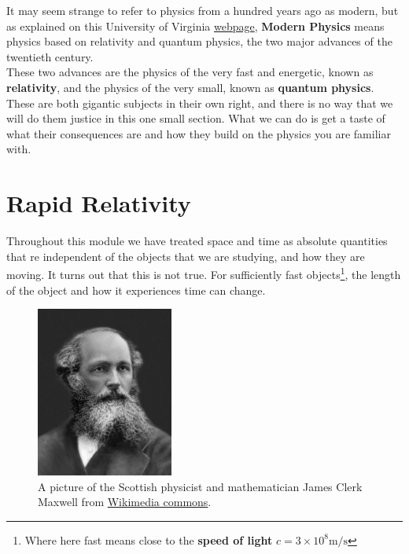 \documentclass[a4paper,12pt]{book}
\begin{document}
It may seem strange to refer to physics from a hundred years ago as modern, but as explained on this University of Virginia \href{https://galileo.phys.virginia.edu/classes/252/home.html}{webpage}, \textbf{Modern Physics} means physics based on relativity and quantum physics, the two major advances of the twentieth century.\\

These two advances are the physics of the very fast and energetic, known as \textbf{relativity}, and the physics of the very small, known as \textbf{quantum physics}. These are both gigantic subjects in their own right, and there is no way that we will do them justice in this one small section. What we can do is get a taste of what their consequences are and how they build on the physics you are familiar with.

\section{Rapid Relativity}
Throughout this module we have treated space and time as absolute quantities that re independent of the objects that we are studying, and how they are moving. It turns out that this is not true. For sufficiently fast objects\footnote{Where here fast means close to the \textbf{speed of light} $c=3\times10^{8}\text{m/s}$}, the length of the object and how it experiences time can change.\\

\begin{figure}[ht]
    \centering
  \includegraphics[width=0.4\textwidth]{figures/James-Clerk-Maxwell.jpg}
    \caption{A picture of the Scottish physicist and mathematician James Clerk Maxwell from \href{https://upload.wikimedia.org/wikipedia/commons/b/b0/James-Clerk-Maxwell-1831-1879.jpg}{Wikimedia commons}.}
\end{figure}
\end{document}
